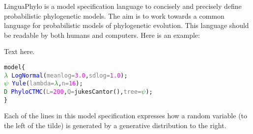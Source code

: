 \documentclass[oneside]{article}
\begin{document}
LinguaPhylo is a model specification language to concisely and
precisely define probabilistic phylogenetic models.
The aim is to work
towards a common language for probabilistic models of phylogenetic
evolution.
This language should be readable by both humans and
computers.
Here is an example: 

\begin{tcolorbox}[breakable, width=\textwidth, colback=gray!10, boxrule=0pt,
  title=Box 1: A simple molecular phylogenetic model, fonttitle=\bfseries]
  \small 
  Text here.

  \hspace{-1cm}
  \begin{minipage}[b]{0.7\textwidth}
    {\singlespacing
\begin{alltt}
    model \{
      \textcolor{green}{\(\lambda\)} ~ \textcolor{blue}{LogNormal}(\textcolor{gray}{meanlog=}\textcolor{magenta}{3.0}, \textcolor{gray}{sdlog=}\textcolor{magenta}{1.0});
      \textcolor{green}{\(\psi\)} ~ \textcolor{blue}{Yule}(\textcolor{gray}{lambda=}\textcolor{green}{\(\lambda\)}, \textcolor{gray}{n=}\textcolor{magenta}{16});
      \textcolor{green}{D} ~ \textcolor{blue}{PhyloCTMC}(\textcolor{gray}{L=}\textcolor{magenta}{200}, \textcolor{gray}{Q=}\textcolor{magenta!80!black}{jukesCantor}(), \textcolor{gray}{tree=}\textcolor{green}{\(\psi\)});
    \}
\end{alltt}
}
  \end{minipage}
  \begin{minipage}[b]{0.3\textwidth}
  \end{minipage}


\end{tcolorbox}
Each of the lines in this model specification expresses how a random
variable (to the left of the tilde) is generated by a generative
distribution to the right. 
\end{document}
